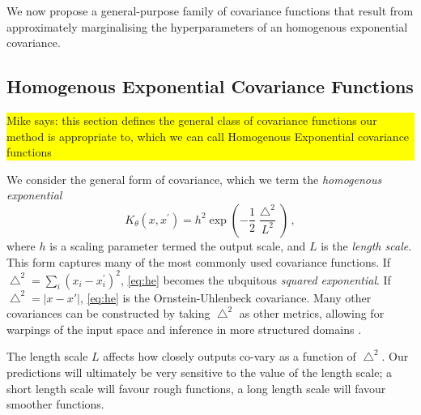 \documentclass{article}
\newcommand\mikesays[1]{\colorbox{yellow}{\parbox{\columnwidth}{Mike says: #1}}}
\begin{document}
We now propose a general-purpose family of covariance functions that result from approximately marginalising the hyperparameters of an homogenous exponential covariance. 


\subsection{Homogenous Exponential Covariance Functions} \mikesays{this section defines the general class of covariance functions our method is appropriate to, which we can call Homogenous Exponential covariance functions}

We consider the general form of covariance, which we term the {\it homogenous exponential}
\begin{equation}\label{eq:he}
K_\theta(x,x^\prime) = h^2 \exp \left( -\frac{1}{2} \frac{\bigtriangleup^2}{L^2} \right)\,,
\end{equation}
where $h$ is a scaling parameter termed the output scale, and $L$ is the \emph{length scale}. This form captures many of the most commonly used covariance functions. If $\bigtriangleup^2 = \sum_i (x_i - x_i^\prime)^2$, \eqref{eq:he} becomes the ubquitous \emph{squared exponential}. If $\bigtriangleup^2 = |x-x'|$,  \eqref{eq:he} is the Ornstein-Uhlenbeck covariance. Many other covariances can be constructed by taking $\bigtriangleup^2$ as other metrics, allowing for warpings of the input space \citep{snelson2004warped} and inference in more structured domains \citep{garnett2010bayesian}.



The length scale $L$ affects how closely outputs co-vary as a function of $\bigtriangleup^2$. Our predictions will ultimately be very sensitive to the value of the length scale; a short length scale will favour rough functions, a long length scale will favour smoother functions. 
\end{document}
